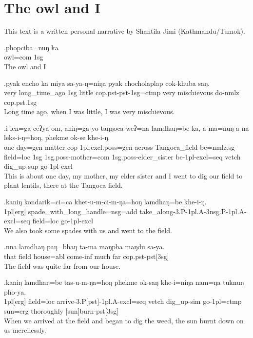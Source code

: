 
\section*{The owl and I}

\noindent This text is a written personal narrative by Shantila Jimi (Kathmandu/Tumok). 

\setcounter{ExNo}{0}

\exg.phopciba=nuŋ   ka\\
 owl{\sc =com} {\sc 1sg}\\
The owl and I

\exg.pyak encho         ka  miya   sa-ya-ŋ=niŋa                pyak chocholaplap cok-khuba      saŋ.\\
 very long\_time\_ago {\sc 1sg} little {\sc cop.pst-pst-1sg=ctmp} very mischievous  do{\sc -nmlz} {\sc cop.pst.1sg}\\
Long time ago, when I was little, I was very mischievous.

\exg.i    len=ga    ceʔya om,  aniŋ=ga  yo taŋŋoca weʔ=na lamdhaŋ=be    ka,  a-ma=nuŋ  a-na leks-i-ŋ=hoŋ, phekme ok-se khe-i-ŋ.\\
 one day=gen matter {\sc cop} {\sc 1pl.excl.poss=gen} across  Tangoca\_field   be{\sc =nmlz.sg} field{\sc =loc} {\sc 1sg} {\sc 1sg.poss-}mother{\sc =com}  {\sc 1sg.poss-}elder\_sister be{\sc -1pl-excl=seq}  vetch  dig\_up{\sc -sup} go{\sc -1pl-excl}\\
This is about one day, my mother, my elder sister and I went to dig our field to plant lentils, there at the Tangoca field.

\exg.kaniŋ   kondarik=ci=ca                         khet-u-m-ci-m-ŋa=hoŋ                                 lamdhaŋ=be    khe-i-ŋ.\\
 {\sc 1pl[erg]} spade\_with\_long\_handle{\sc =nsg=add} take\_along{\sc -3.P-1pl.A-3nsg.P-1pl.A-excl=seq}  field{\sc  =loc} go{\sc -1pl-excl}\\
We also took some spades with us and went to the field.

\exg.nna  lamdhaŋ paŋ=bhaŋ    ta-ma      maŋpha maŋdu sa-ya.\\
 that field    house{\sc =abl}  come{\sc -inf} much    far    {\sc cop.pst-pst[3sg]}\\
The field was quite far from our house.

\exg.kaniŋ lamdhaŋ=be    tas-u-m-ŋa=hoŋ                       phekme ok-saŋ          khe-i=niŋa         nam=ŋa   tuknuŋ    pho-ya.\\
 {\sc 1pl[erg]}   field{\sc =loc} arrive{\sc -3.P[pst]-1pl.A-excl=seq} vetch  dig\_up{\sc -sim} go{\sc  -1pl=ctmp} sun{\sc =erg} thoroughly [sun]burn{\sc -pst[3sg]}\\
When we arrived at the field and began to dig the weed, the sun burnt down on us mercilessly.

